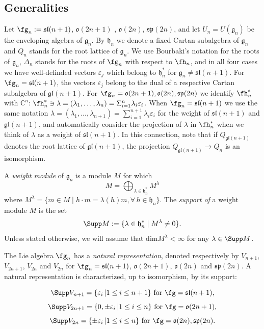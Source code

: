 \documentclass[12pt]{amsart}
\def\gg{\mathfrak{g}}
\def\gh{\mathfrak{h}}
\def\gl{\mathfrak{l}}
\def\go{\mathfrak{o}}
\def\gp{\mathfrak{p}}
\def\gs{\mathfrak{s}}
\def\gh{\mathfrak h}
\begin{document}
\subsection {Generalities} \label{subsec-general-sln}  
Let $\fg_n:=\mathfrak{sl}({n+1})$, $\mathfrak{o}({2n+1})$ , $\mathfrak{o}({2n})$, $\mathfrak{sp}({2n})$, and let $U_{n}=U(\mathfrak{g}_n)$ be the enveloping algebra of $\mathfrak{g}_n$. By $\mathfrak{h}_n$ we denote a fixed Cartan subalgebra of $\mathfrak{g}_n$ and $Q_n$ stands for the root lattice of $\mathfrak{g}_n$. We use Bourbaki's notation for the roots of $\mathfrak{g}_n$, $\Delta_n$ stands for the roots of $\fg_n$ with respect to $\fh_n$, and in all four cases we have well-definded vectors $\varepsilon_j$ which belong to $\mathfrak{h}_n^*$ for $\mathfrak{g}_n\neq\mathfrak{sl}({n+1})$. For $\fg_n=\mathfrak{sl}(n+1)$, the vectors $\varepsilon_j$ belong to the dual of a respective Cartan subalgebra of $\mathfrak{gl}(n+1)$. For $\fg_n=\go(2n+1),\go(2n),\gs\gp(2n)$ we identify $\fh_n^*$ with $\mathbb{C}^{n}$: $\fh_n^*\ni\lambda=(\lambda_1,\dots,\lambda_{n})=\Sigma_{i=1}^n\lambda_i\varepsilon_i$. When $\fg_n=\gs\gl(n+1)$ we use the same notation  $\lambda=(\lambda_1,\dots, \lambda_{n+1})=\sum_{i=1}^{n+1}\lambda_i\varepsilon_i$ for the weight of $\mathfrak{sl}(n+1)$ and  $\mathfrak{gl}(n+1)$, and automatically consider the projection of $\lambda$ in $\fh^*_n$ when we think of $\lambda$ as a weight of $\mathfrak{sl}(n+1)$. In this connection, note that if $Q_{\mathfrak{gl}(n+1)}$ denotes the root lattice of  $\mathfrak{gl}(n+1)$, the projection $Q_{\mathfrak{gl}(n+1)} \to Q_n$ is an isomorphism.

A {\it weight module} of $\gg_n$ is a module $M$ for which 
$$
M = \bigoplus_{\lambda \in \gh_n^*} M^{\lambda}
$$
where $M^{\lambda} = \{ m \in M \; | \; h\cdot m = \lambda(h)m, \forall \, h \in \gh_n\}$.  The\emph{ support of} a weight module $M$ is the set 
$$
\Supp M := \{\lambda \in \gh_n^* \; | \; M^{\lambda} \neq 0\}.
$$
Unless stated otherwise, we will assume that dim$M^\lambda<\infty$ for any $\lambda\in \Supp M$.

The Lie algebra $\fg_n$ has a \emph{ natural representation}, denoted respectively by $V_{n+1}$, $V_{2n+1}$, $V_{2n}$ and $V_{2n}$ for $\fg_n=\gs\gl(n+1)$,   $\go(2n+1)$, $\go(2n)$ and $\gs\gp(2n)$. A natural representation is characterized, up to isomorphism, by its support:

$$ \Supp V_{n+1} =  \{\varepsilon_i \, |1\leq i\leq n+1 \} \text{ for} \,\, \fg=\mathfrak{sl}(n+1),$$
$$   \Supp V_{2n+1} = \{0,\pm\varepsilon_i  \, |1\leq i\leq n \} \text{ for} \,\, \fg=\mathfrak{o}(2n+1),$$ 
$$   \Supp V_{2n} = \{\pm\varepsilon_i  \, |1\leq i\leq n \} \text{ for} \,\, \fg=\mathfrak{o}(2n), \mathfrak{sp}(2n).$$
\end{document}
